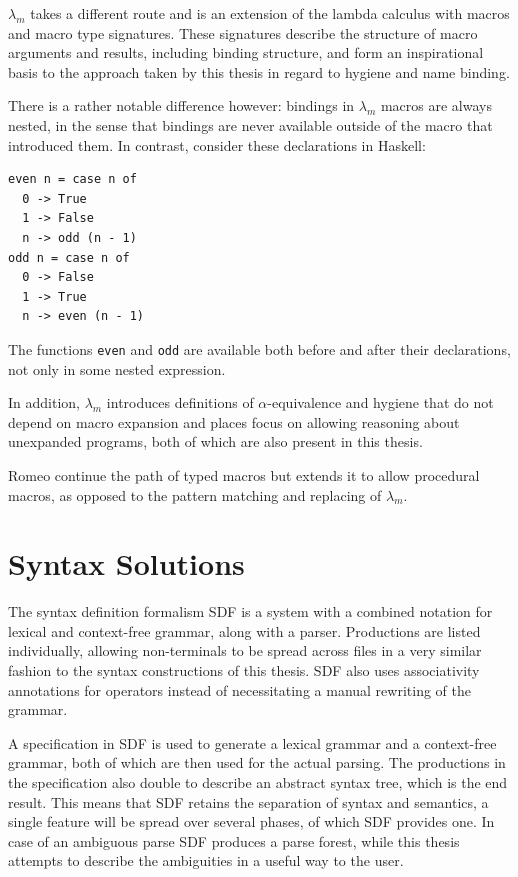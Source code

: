 \documentclass{kththesis}
\begin{document}
$\lambda_m$ \cite{Herman2010A-Theory-of-Typ} takes a different route and is an extension of the lambda calculus with macros and macro type signatures. These signatures describe the structure of macro arguments and results, including binding structure, and form an inspirational basis to the approach taken by this thesis in regard to hygiene and name binding.

There is a rather notable difference however: bindings in $\lambda_m$ macros are always nested, in the sense that bindings are never available outside of the macro that introduced them. In contrast, consider these declarations in Haskell:
\begin{verbatim}
even n = case n of
  0 -> True
  1 -> False
  n -> odd (n - 1)
odd n = case n of
  0 -> False
  1 -> True
  n -> even (n - 1)
\end{verbatim}
The functions \texttt{even} and \texttt{odd} are available both before and after their declarations, not only in some nested expression.

In addition, $\lambda_m$ introduces definitions of $\alpha$-equivalence and hygiene that do not depend on macro expansion and places focus on allowing reasoning about unexpanded programs, both of which are also present in this thesis.

Romeo \cite{Stansifer2014Romeo} continue the path of typed macros but extends it to allow procedural macros, as opposed to the pattern matching and replacing of $\lambda_m$.

\section{Syntax Solutions} \label{sec:syntax-solutions}

The syntax definition formalism SDF \cite{Heering1989The-syntax-defi} is a system with a combined notation for lexical and context-free grammar, along with a parser. Productions are listed individually, allowing non-terminals to be spread across files in a very similar fashion to the syntax constructions of this thesis. SDF also uses associativity annotations for operators instead of necessitating a manual rewriting of the grammar.

A specification in SDF is used to generate a lexical grammar and a context-free grammar, both of which are then used for the actual parsing. The productions in the specification also double to describe an abstract syntax tree, which is the end result. This means that SDF retains the separation of syntax and semantics, a single feature will be spread over several phases, of which SDF provides one. In case of an ambiguous parse SDF produces a parse forest, while this thesis attempts to describe the ambiguities in a useful way to the user.
\end{document}
